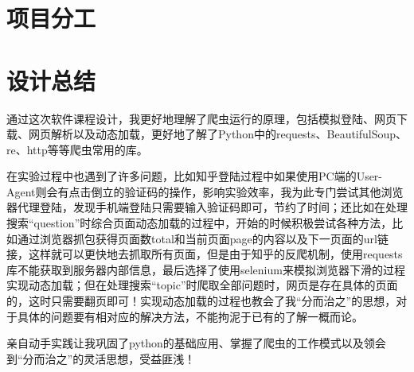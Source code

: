 \documentclass[UTF-8,a4paper, 12pt]{article}
\numberwithin{equation}{section}
\begin{document}
\section{项目分工}

\begin{table}[!htbp]
  \centering
  \renewcommand\arraystretch{1.5}
 \end{table}
\newpage

\section{设计总结}

通过这次软件课程设计，我更好地理解了爬虫运行的原理，包括模拟登陆、网页下载、网页解析以及动态加载，更好地了解了Python中的requests、BeautifulSoup、re、http等等爬虫常用的库。

在实验过程中也遇到了许多问题，比如知乎登陆过程中如果使用PC端的User-Agent则会有点击倒立的验证码的操作，影响实验效率，我为此专门尝试其他浏览器代理登陆，发现手机端登陆只需要输入验证码即可，节约了时间；还比如在处理搜索“question”时综合页面动态加载的过程中，开始的时候积极尝试各种方法，比如通过浏览器抓包获得页面数total和当前页面page的内容以及下一页面的url链接，这样就可以更快地去抓取所有页面，但是由于知乎的反爬机制，使用requests库不能获取到服务器内部信息，最后选择了使用selenium来模拟浏览器下滑的过程实现动态加载；但在处理搜索“topic”时爬取全部问题时，网页是存在具体的页面的，这时只需要翻页即可！实现动态加载的过程也教会了我“分而治之”的思想，对于具体的问题要有相对应的解决方法，不能拘泥于已有的了解一概而论。

亲自动手实践让我巩固了python的基础应用、掌握了爬虫的工作模式以及领会到“分而治之”的灵活思想，受益匪浅！



\newpage



\end{document}
